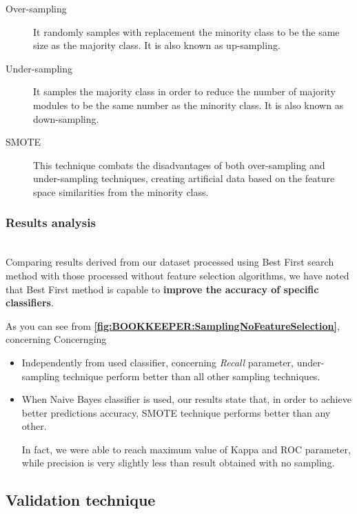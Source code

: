 \documentclass[sigconf]{acmart}
\begin{document}
\begin{description}
\item[Over-sampling] It randomly samples with replacement the minority class to be the same size as the majority class. It is also known as up-sampling.

\item[Under-sampling] It samples the majority class in order to reduce the number of majority modules to be the same number as the minority class. It is also known as down-sampling.

\item[SMOTE] This technique combats the disadvantages of both over-sampling and under-sampling techniques, creating artificial data based on the feature space similarities from the minority class. 

\end{description}

\subsubsection{Results analysis}
\hfill\\
Comparing results derived from our dataset processed using Best First search method with those processed without feature selection algorithms, we have noted that Best First method is capable to \textbf{improve the accuracy of specific classifiers}.

As you can see from \textbf{\cref{fig:BOOKKEEPER:SamplingNoFeatureSelection}}, concerning
Concernging 

\begin{itemize}
\item Independently from used classifier, concerning \textit{Recall} parameter, under-sampling technique perform better than all other sampling techniques.

\item When Naive Bayes classifier is used, our results state that, in order to achieve better predictions accuracy, SMOTE technique performs better than any other. 

In fact, we were able to reach maximum value of Kappa and ROC parameter, while precision is very slightly less than result obtained with no sampling. 

\end{itemize}




\subsection{Validation technique}
\end{document}

